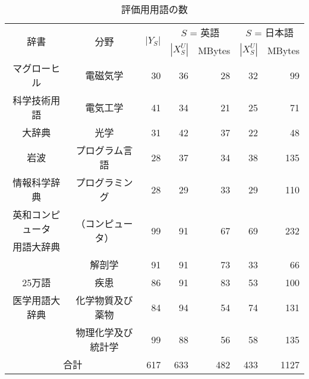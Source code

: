 \documentclass[japanese]{jnlp_1.3a}
\begin{document}
\begin{table}[b]
 \small
 \centering
 \caption{評価用用語の数}
 \label{tab:mondai_number}
 \begin{tabular}{|c|c|r|r|r|r|r|}
  \hline
  \multirow{2}{*}{辞書} & \multirow{2}{*}{分野} &
  \multirow{2}{*}{$|Y_{S}|$} & \multicolumn{2}{|c|}{$S$ = 英語} &
  \multicolumn{2}{|c|}{$S$ = 日本語}\\
  \hhline{|~|~|~|--|--|}
  & & & $|X_S^U|$ & MBytes & $|X_S^U|$ & MBytes\\
  \hline
  \hline
  マグローヒル & 電磁気学       & 30 & 36 & 28 & 32 & 99\\
  科学技術用語 & 電気工学       & 41 & 34 & 21 & 25 & 71\\
  大辞典       & 光学           & 31 & 42 & 37 & 22 & 48\\
  \hline				      	   
  岩波         & プログラム言語 & 28 & 37 & 34 & 38 & 135\\
  情報科学辞典 & プログラミング & 28 & 29 & 33 & 29 & 110\\
  \hline
  英和コンピュータ & \multirow{2}{*}{（コンピュータ）} & 
  \multirow{2}{*}{99} & \multirow{2}{*}{91} & \multirow{2}{*}{67} &
  \multirow{2}{*}{69} & \multirow{2}{*}{232}\\
  用語大辞典     & & & & & &\\
  \hline
                 & 解剖学             &  91 & 91 & 73 & 33 &  66\\
  25万語         & 疾患               &  86 & 91 & 83 & 53 & 100\\
  医学用語大辞典 & 化学物質及び薬物   &  84 & 94 & 54 & 74 & 131\\
                 & 物理化学及び統計学 &  99 & 88 & 56 & 58 & 135\\
  \hline
  \hline
  \multicolumn{2}{|c|}{合計} & 617 & 633 & 482 & 433 & 1127\\
  \hline
 \end{tabular}
\end{table}
\end{document}
